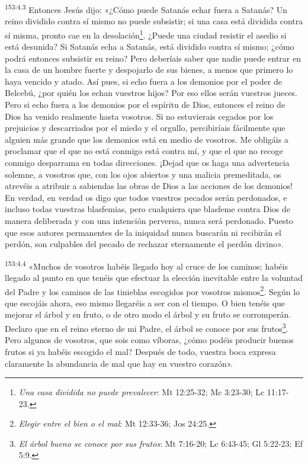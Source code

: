 \par 
\textsuperscript{153:4.3} Entonces Jesús dijo: «¿Cómo puede Satanás echar fuera a Satanás? Un reino dividido contra sí mismo no puede subsistir; si una casa está dividida contra sí misma, pronto cae en la desolación\footnote{\textit{Una casa dividida no puede prevalecer}: Mt 12:25-32; Mc 3:23-30; Lc 11:17-23.}. ¿Puede una ciudad resistir el asedio si está desunida? Si Satanás echa a Satanás, está dividido contra sí mismo; ¿cómo podrá entonces subsistir su reino? Pero deberíais saber que nadie puede entrar en la casa de un hombre fuerte y despojarlo de sus bienes, a menos que primero lo haya vencido y atado. Así pues, si echo fuera a los demonios por el poder de Belcebú, ¿por quién los echan vuestros hijos? Por eso ellos serán vuestros jueces. Pero si echo fuera a los demonios por el espíritu de Dios, entonces el reino de Dios ha venido realmente hasta vosotros. Si no estuvierais cegados por los prejuicios y descarriados por el miedo y el orgullo, percibiríais fácilmente que alguien más grande que los demonios está en medio de vosotros. Me obligáis a proclamar que el que no está conmigo está contra mí, y que el que no recoge conmigo desparrama en todas direcciones. ¡Dejad que os haga una advertencia solemne, a vosotros que, con los ojos abiertos y una malicia premeditada, os atrevéis a atribuir a sabiendas las obras de Dios a las acciones de los demonios! En verdad, en verdad os digo que todos vuestros pecados serán perdonados, e incluso todas vuestras blasfemias, pero cualquiera que blasfeme contra Dios de manera deliberada y con una intención perversa, nunca será perdonado. Puesto que esos autores permanentes de la iniquidad nunca buscarán ni recibirán el perdón, son culpables del pecado de rechazar eternamente el perdón divino».

\par 
\textsuperscript{153:4.4} «Muchos de vosotros habéis llegado hoy al cruce de los caminos; habéis llegado al punto en que tenéis que efectuar la elección inevitable entre la voluntad del Padre y los caminos de las tinieblas escogidos por vosotros mismos\footnote{\textit{Elegir entre el bien o el mal}: Mt 12:33-36; Jos 24:25.}. Según lo que escojáis ahora, eso mismo llegaréis a ser con el tiempo. O bien tenéis que mejorar el árbol y su fruto, o de otro modo el árbol y su fruto se corromperán. Declaro que en el reino eterno de mi Padre, el árbol se conoce por sus frutos\footnote{\textit{El árbol bueno se conoce por sus frutos}: Mt 7:16-20; Lc 6:43-45; Gl 5:22-23; Ef 5:9.}. Pero algunos de vosotros, que sois como víboras, ¿cómo podéis producir buenos frutos si ya habéis escogido el mal? Después de todo, vuestra boca expresa claramente la abundancia de mal que hay en vuestro corazón».

